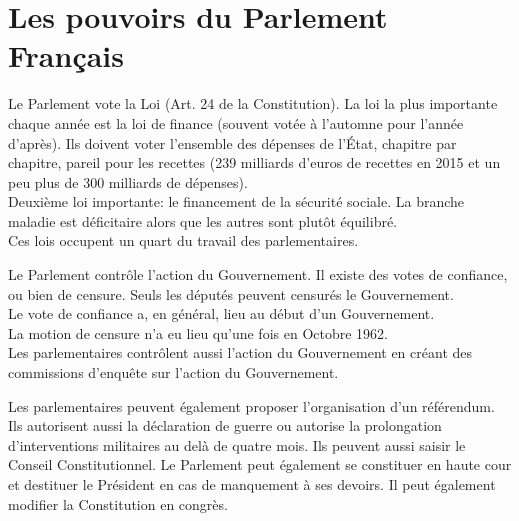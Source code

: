 \documentclass[12pt, a4paper, openany]{book}
\begin{document}
\section{Les pouvoirs du Parlement Français}

Le Parlement vote la Loi (Art. 24 de la Constitution). La loi la plus importante chaque année est la loi de finance (souvent votée à l'automne pour l'année d'après). Ils doivent voter l'ensemble des dépenses de l'État, chapitre par chapitre, pareil pour les recettes (239 milliards d'euros de recettes en 2015 et un peu plus de 300 milliards de dépenses). \\
Deuxième loi importante: le financement de la sécurité sociale. La branche maladie est déficitaire alors que les autres sont plutôt équilibré. \\
Ces lois occupent un quart du travail des parlementaires. 


Le Parlement contrôle l'action du Gouvernement. Il existe des votes de confiance, ou bien de censure. Seuls les députés peuvent censurés le Gouvernement. \\
Le vote de confiance a, en général, lieu au début d'un Gouvernement. \\
La motion de censure n'a eu lieu qu'une fois en Octobre 1962. \\
Les parlementaires contrôlent aussi l'action du Gouvernement en créant des commissions d'enquête sur l'action du Gouvernement. 


Les parlementaires peuvent également proposer l'organisation d'un référendum. Ils autorisent aussi la déclaration de guerre ou autorise la prolongation d'interventions militaires au delà de quatre mois. Ils peuvent aussi saisir le Conseil Constitutionnel. Le Parlement peut également se constituer en haute cour et destituer le Président en cas de manquement à ses devoirs. Il peut également modifier la Constitution en congrès.
\end{document}

